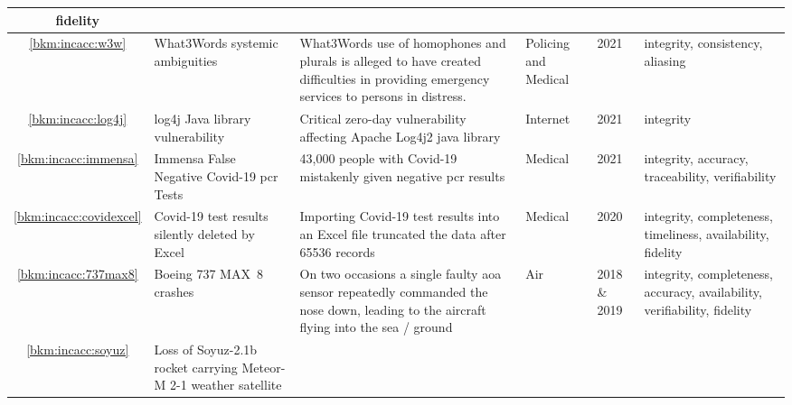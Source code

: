 \begin{longtable}{|C{}|L{}|L{}|L{}|L{}|L{}|}
  \gls{fidelity}\\
  \hline
  \ref{bkm:incacc:w3w} & What3Words systemic ambiguities &
  What3Words use of homophones and plurals is alleged to have created difficulties in providing emergency services
  to persons in distress.
  &
  Policing and Medical & 2021 & \Gls{integrity},
  \gls{consistency},
  \gls{aliasing}\\
  \hline
        \ref{bkm:incacc:log4j} & log4j Java library vulnerability &
        Critical zero-day vulnerability affecting Apache Log4j2 java library &
        Internet & 2021 & \Gls{integrity}\\
        \hline
        \ref{bkm:incacc:immensa} & Immensa False Negative Covid-19 \gls{pcr} Tests &
        43,000 people with Covid-19 mistakenly given negative \gls{pcr} results &
        Medical & 2021 & \Gls{integrity}, \gls{accuracy}, \gls{traceability}, \gls{verifiability}\\
        \hline
        \ref{bkm:incacc:covidexcel} & Covid-19 test results silently deleted by Excel &
        Importing Covid-19 test results into an Excel file truncated the data after 65536 records &
        Medical & 2020 & \Gls{integrity}, \gls{completeness}, \gls{timeliness}, \gls{availability}, \gls{fidelity}\\
        \hline
	\ref{bkm:incacc:737max8} & Boeing 737 MAX~8 crashes &
	On two occasions a single faulty \gls{aoa} sensor repeatedly commanded the nose down,
        leading to the aircraft flying into the sea / ground
	& Air & 2018 \& 2019 & \Gls{integrity}, \gls{completeness}, \gls{accuracy}, \gls{availability}, \gls{verifiability}, \gls{fidelity}\\ 
	\hline
        \ref{bkm:incacc:soyuz} & Loss of Soyuz-2.1b rocket carrying Meteor-M 2-1 weather satellite &

\end{longtable}
